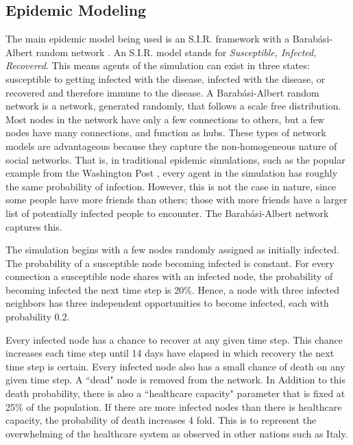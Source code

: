 \documentclass[12pt]{article}
\begin{document}
\begin{multicols}{2}
\subsection{Epidemic Modeling}
The main epidemic model being used is an S.I.R. framework with a Barabási-Albert random network \cite{kermack1927contribution, barabasi1999emergence}. An S.I.R. model stands for \emph{Susceptible, Infected, Recovered}.
This means agents of the simulation can exist in three states: susceptible to getting infected with the disease, infected with the disease, or recovered and therefore immune to the disease.
A Barabási-Albert random network is a network, generated randomly, that follows a scale free distribution.
Most nodes in the network have only a few connections to others, but a few nodes have many connections, and function as hubs.
These types of network models are advantageous because they capture the non-homogeneous nature of social networks.
That is, in traditional epidemic simulations, such as the popular example from the Washington Post \cite{stevens_2020}, every agent in the simulation has roughly the same probability of infection.
However, this is not the case in nature, since some people have more friends than others; those with more friends have a larger list of potentially infected people to encounter.
The Barabási-Albert network captures this.

The simulation begins with a few nodes randomly assigned as initially infected. The probability of a susceptible node becoming infected is constant. For every connection a susceptible node shares with an infected node, the probability of becoming infected the next time step is 20\%. Hence, a node with three infected neighbors has three independent opportunities to become infected, each with probability 0.2.

Every infected node has a chance to recover at any given time step.
This chance increases each time step until 14 days have elapsed in which recovery the next time step is certain.
Every infected node also has a small chance of death on any given time step. A ``dead" node is removed from the network.
In Addition to this death probability, there is also a ``healthcare capacity" parameter that is fixed at 25\% of the population. If there are more infected nodes than there is healthcare capacity, the probability of death increases 4 fold. This is to represent the overwhelming of the healthcare system as observed in other nations such as Italy.


\end{multicols}
\end{document}
